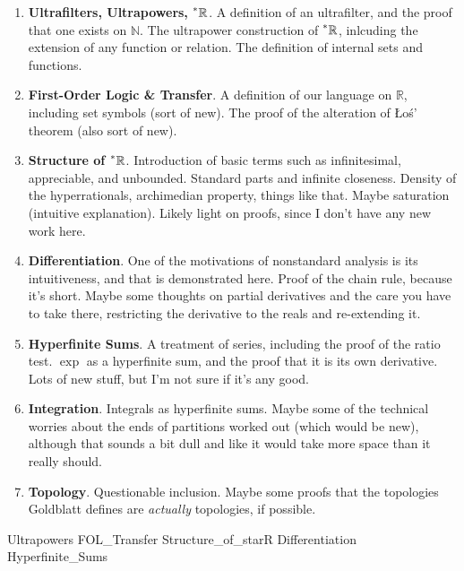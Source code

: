 \documentclass{article}
\newcommand{\reals}{\mathbb{R}}
\newcommand{\hreals}{\prescript{*}{}{\mathbb{R}}}
\newcommand{\nats}{\mathbb{N}}
\theoremstyle{definition}
\begin{document}
\begin{enumerate}
    \item \textbf{Ultrafilters, Ultrapowers, $\hreals$}. A definition of an ultrafilter, and the proof that one exists on $\nats$. The ultrapower construction of $\hreals$, inlcuding the extension of any function or relation. The definition of internal sets and functions.
    \item \textbf{First-Order Logic \& Transfer}. A definition of our language on $\reals$, including set symbols (sort of new). The proof of the alteration of \L o\'s' theorem (also sort of new).
    \item \textbf{Structure of $\hreals$}. Introduction of basic terms such as infinitesimal, appreciable, and unbounded. Standard parts and infinite closeness. Density of the hyperrationals, archimedian property, things like that. Maybe saturation (intuitive explanation). Likely light on proofs, since I don't have any new work here.
    \item \textbf{Differentiation}. One of the motivations of nonstandard analysis is its intuitiveness, and that is demonstrated here. Proof of the chain rule, because it's short. Maybe some thoughts on partial derivatives and the care you have to take there, restricting the derivative to the reals and re-extending it.
    \item \textbf{Hyperfinite Sums}. A treatment of series, including the proof of the ratio test. $\exp$ as a hyperfinite sum, and the proof that it is its own derivative. Lots of new stuff, but I'm not sure if it's any good.
    \item \textbf{Integration}. Integrals as hyperfinite sums. Maybe some of the technical worries about the ends of partitions worked out (which would be new), although that sounds a bit dull and like it would take more space than it really should. 
    \item \textbf{Topology}. Questionable inclusion. Maybe some proofs that the topologies Goldblatt defines are \textit{actually} topologies, if possible.
\end{enumerate}

{Ultrapowers}
{FOL_Transfer}
{Structure_of_starR}
{Differentiation}
{Hyperfinite_Sums}


\nocite{*}
\end{document}
